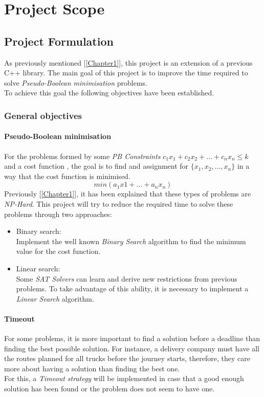 \chapter{Project Scope}
\label{Chapter2}

\section{Project Formulation}

As previously mentioned [\ref{Chapter1}], this project is an extension of a previous C++ library. The main goal of this project is to improve the time required to solve \emph{Pseudo-Boolean minimisation} problems. \\
To achieve this goal the following objectives have been established. 

\subsection{General objectives}

\subsubsection{Pseudo-Boolean minimisation}
For the problems formed by some \emph{PB Constraints} $c_{1}x_{1}+c_{2}x_{2}+\ldots +c_{n}x_{n} \leq k$ and a cost function , the goal is to find and assignment for $\{x_{1},x_{2},\ldots,x_{n}\}$ in a way that the cost function is minimised. $$min(a_{1}x{1} + ... + a_{n}x_{n})$$
Previously [\ref{Chapter1}], it has been explained that these types of problems are \emph{NP-Hard}. This project will try to reduce the required time to solve these problems through two approaches:
\begin{itemize}
	\item Binary search:\\
	Implement the well known \emph{Binary Search} algorithm to find the minimum value for the cost function.	
	\item Linear search:\\
	Some \emph{SAT Solvers} can learn and derive new restrictions from previous problems. To take advantage of this ability, it is necessary to implement a \emph{Linear Search} algorithm.
\end{itemize}

\subsubsection{Timeout}
For some problems, it is more important to find a solution before a deadline than finding the best possible solution. For instance, a delivery company must have all the routes planned for all trucks before the journey starts, therefore, they care more about having a solution than finding the best one.\\
For this, a \emph{Timeout strategy} will be implemented in case that a good enough solution has been found or the problem does not seem to have one. 
